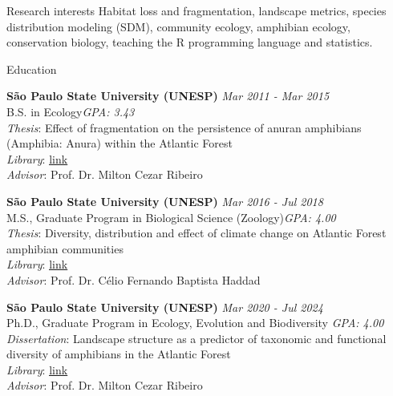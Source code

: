 \documentclass{resume}
\begin{document}

\begin{rSection}{Research interests}
Habitat loss and fragmentation, landscape metrics, species distribution modeling (SDM), community ecology, amphibian ecology, conservation biology, teaching the R programming language and statistics.
\end{rSection}


\begin{rSection}{Education}

{\bf São Paulo State University (UNESP)} \hfill {\em Mar 2011 - Mar 2015}\\
B.S. in Ecology\hfill {\em GPA: 3.43}\\
{\it Thesis}: Effect of fragmentation on the persistence of anuran amphibians (Amphibia: Anura) within the Atlantic Forest\\
{\it Library}: \href{http://hdl.handle.net/11449/138991}{\underline{link}}\\
{\it Advisor}: Prof. Dr. Milton Cezar Ribeiro

{\bf São Paulo State University (UNESP)} \hfill {\em Mar 2016 - Jul 2018}\\
M.S., Graduate Program in Biological Science (Zoology)\hfill {\em GPA: 4.00}\\
{\it Thesis}: Diversity, distribution and effect of climate change on Atlantic Forest amphibian communities\\
{\it Library}: \href{http://hdl.handle.net/11449/154993}{\underline{link}}\\
{\it Advisor}: Prof. Dr. Célio Fernando Baptista Haddad

{\bf São Paulo State University (UNESP)} \hfill {\em Mar 2020 - Jul 2024}\\
Ph.D., Graduate Program in Ecology, Evolution and Biodiversity \hfill {\em GPA: 4.00}\\
{\it Dissertation}: Landscape structure as a predictor of taxonomic and functional diversity of amphibians in the Atlantic Forest\\
{\it Library}: \href{https://hdl.handle.net/11449/256726}{\underline{link}}\\
{\it Advisor}: Prof. Dr. Milton Cezar Ribeiro

\end{rSection}
\end{document}
